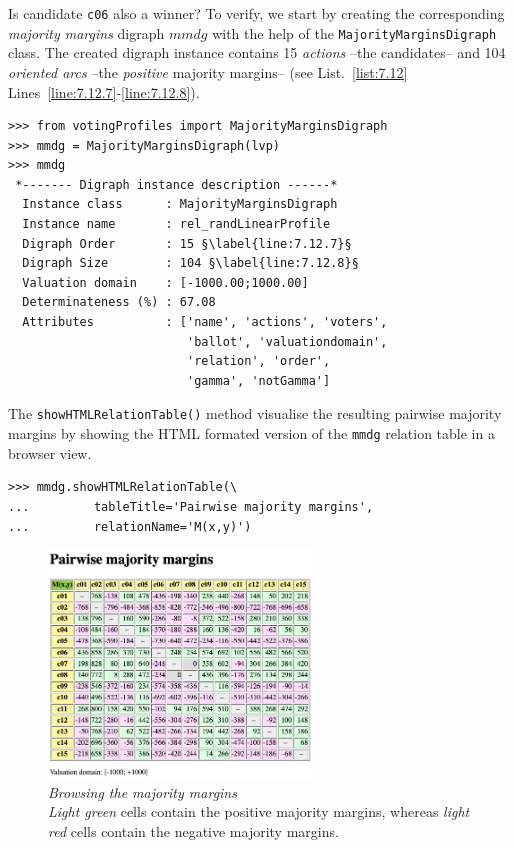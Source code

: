 Is candidate \texttt{c06} also a \Condorcet winner? To verify, we start by creating the corresponding \emph{majority margins} digraph $mmdg$ with the help of the \texttt{MajorityMarginsDi\-graph} class. The created digraph instance contains 15 \emph{actions} --the candidates-- and 104 \emph{oriented arcs} --the \emph{positive} majority margins-- (see List.~\vref{list:7.12} Lines~\ref{line:7.12.7}-\ref{line:7.12.8}).
\begin{lstlisting}[caption={A majority margins digraph constructed from a linear voting profile},label=list:7.12]
>>> from votingProfiles import MajorityMarginsDigraph
>>> mmdg = MajorityMarginsDigraph(lvp)
>>> mmdg
 *------- Digraph instance description ------*
  Instance class      : MajorityMarginsDigraph
  Instance name       : rel_randLinearProfile
  Digraph Order       : 15 §\label{line:7.12.7}§ 
  Digraph Size        : 104 §\label{line:7.12.8}§ 
  Valuation domain    : [-1000.00;1000.00]
  Determinateness (%) : 67.08
  Attributes          : ['name', 'actions', 'voters',
                         'ballot', 'valuationdomain',
                         'relation', 'order',
                         'gamma', 'notGamma']
\end{lstlisting}

The \texttt{showHTMLRelationTable()} method visualise the resulting pairwise majority margins by showing the HTML formated version of the \texttt{mmdg} relation table in a browser view.
\begin{lstlisting}
>>> mmdg.showHTMLRelationTable(\
...         tableTitle='Pairwise majority margins',
...         relationName='M(x,y)')
\end{lstlisting}
\begin{figure}[ht]
\sidecaption[t]
\includegraphics[width=7cm]{Figures/7-4-majorityMargins.png}
\caption[Browsing the majority margins]{\emph{Browsing the majority margins}\\ \emph{Light green} cells contain the positive majority margins, whereas \emph{light red} cells contain the negative majority margins.}
\label{fig:7.4}       %
\end{figure}

